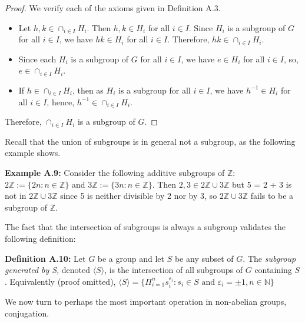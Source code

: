 \documentclass[12pt]{article}
\newcommand{\vs}{\vskip10pt}
\begin{document}
	\begin{proof}
		We verify each of the axioms given in Definition A.3. 
		
		\begin{itemize}
			\item Let $h,k \in \cap_{i \in I} H_i$. Then $h,k \in H_i$ for all $i \in I$. Since $H_i$ is a subgroup of $G$ for all $i \in I$, we have $hk \in H_i$ for all $i \in I$. Therefore, $hk \in \cap_{i \in I} H_i$. 
			\item Since each $H_i$ is a subgroup of $G$ for all $i \in I$, we have $e \in H_i$ for all $i \in I$, so, $e \in \cap_{i \in I} H_i$. 
			\item If $h \in \cap_{i \in I} H_i$, then as $H_i$ is a subgroup for all $i \in I$, we have $h^{-1} \in H_i$ for all $i \in I$, hence, $h^{-1} \in \cap_{i \in I} H_i$. 
		\end{itemize}
		
		Therefore, $\cap_{i \in I} H_i$ is a subgroup of $G$.
		
	\end{proof}
	
	Recall that the union of subgroups is in general not a subgroup, as the following example shows. 
	
	\vs
	
	\textbf{Example A.9: } Consider the following additive subgroups of $\mathbb{Z}$: $2 \mathbb{Z} := \{2n: n \in \mathbb{Z}\}$ and $3 \mathbb{Z} := \{3n: n \in \mathbb{Z}\}$. Then $2,3 \in 2\mathbb{Z} \cup 3\mathbb{Z}$ but 5 = 2 + 3 is not in $2 \mathbb{Z} \cup 3 \mathbb{Z}$ since 5 is neither divisible by 2 nor by 3, so $2 \mathbb{Z} \cup 3 \mathbb{Z}$ fails to be a subgroup of $\mathbb{Z}$. 
	
	\vs 
	
	The fact that the intersection of subgroups is always a subgroup validates the following definition: 
	
	\vs 
	
	\textbf{Definition A.10: } Let $G$ be a group and let $S$ be any subset of $G$. The \textit{subgroup generated by S}, denoted $\langle S \rangle$, is the intersection of all subgroups of $G$ containing $S$. Equivalently (proof omitted), $\langle S \rangle = \{\Pi_{i=1}^n s_i^{\varepsilon_i} : s_i \in S \text{ and } \varepsilon_i = \pm 1, n \in \mathbb{N}\}$
	
	\vs 
	
	We now turn to perhaps the most important operation in non-abelian groups, conjugation. 
	
\end{document}
